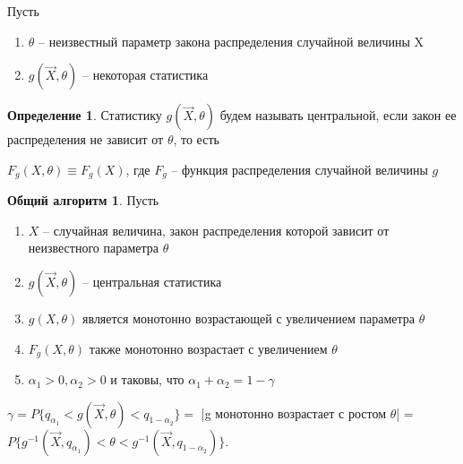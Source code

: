 \documentclass[a4paper, 12pt]{article}
\theoremstyle{definition}
\newtheorem{definition}{Определение}[section]
\theoremstyle{leads}
\theoremstyle{example}
\begin{document}
Пусть 
\begin{enumerate}
	\item $\theta$ -- неизвестный параметр закона распределения случайной величины X
	\item $g(\vec{X}, \theta)$ --  некоторая статистика
\end{enumerate}
\begin{definition}
	Статистику $g(\vec{X}, \theta)$ будем называть центральной, если закон  ее распределения не зависит от $\theta$, то есть
	\begin{center}
		\centering
		$F_g(X, \theta) \equiv F_g(X)$, где $F_g$ -- функция распределения случайной величины $g$
	\end{center}
\end{definition}
\newtheorem*{algo}{Общий алгоритм}
\begin{algo}
Пусть  
\begin{enumerate}
  \item $X$ -- случайная величина, закон распределения которой зависит от неизвестного параметра $\theta$
  \item $g(\vec{X}, \theta)$ -- центральная статистика
  \item $g(X, \theta)$  является монотонно возрастающей с увеличением  параметра $\theta$
  \item $F_{g}(X, \theta)$ также монотонно возрастает с увеличением $\theta$
  \item $\alpha_1 > 0, \alpha_2 > 0$  и таковы, что $\alpha_1 + \alpha_2 = 1 - \gamma$\\
\end{enumerate}
$\gamma = P\{q_{\alpha_1} < g(\vec{X}, \theta) < q_{1 - \alpha_2}\} = $ |g монотонно возрастает с ростом $\theta$| = $P\{g^{-1}(\vec{X}, q_{\alpha_1}) < \theta < g^{-1}(\vec{X}, q_{1 - \alpha_2})\}$.
\end{algo}
\end{document}

